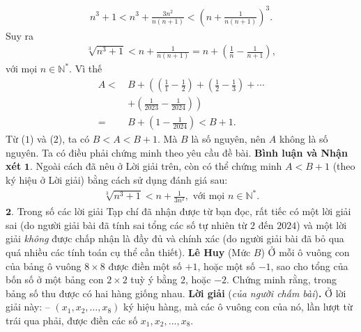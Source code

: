 \begin{multicols}{2}
	\begin{align*}
		{n^3} \!+\! 1 \!<\! {n^3} \!+\! \frac{{3{n^2}}}{{n\left( {n \!+\! 1} \right)}} \!<\! {\left( {n \!+\! \frac{1}{{n\left( {n \!+\! 1} \right)}}} \right)^3}\!.
	\end{align*}
	Suy ra
	\begin{align*}
		\sqrt[3]{{{n^3} \!+\! 1}} \!<\! n \!+\! \frac{1}{{n\left( {n \!+\! 1} \right)}} \!=\! n \!+\! \left( {\frac{1}{n} \!-\! \frac{1}{{n \!+\! 1}}} \right)\!,
	\end{align*}
	với mọi $n \in \mathbb{N^*}$.
	\vskip 0.05cm  
	Vì thế
	\begin{align*}
		A <\,& B + \left( \left( {\frac{1}{1} - \frac{1}{2}} \right) + \left( {\frac{1}{2} - \frac{1}{3}} \right) +  \cdots\right.  \\
			&\left.+ \left( {\frac{1}{{2023}} - \frac{1}{{2024}}} \right) \right) \\
		= \,&B + \left( {1 - \frac{1}{{2024}}} \right) < B + 1. \tag{$2$}
	\end{align*}
	Từ ($1$) và ($2$), ta có $B < A < B + 1$. Mà $B$ là số nguyên, nên $A$ không là số nguyên.
	\vskip 0.05cm
	Ta có điều phải chứng minh theo yêu cầu đề bài.
	\vskip 0.05cm
	\textbf{\color{thachthuctoanhoc}Bình luận và Nhận xét}
	\vskip 0.05cm
	$\pmb{1.}$ Ngoài cách đã nêu ở Lời giải trên, còn có thể chứng minh $A < B + 1$ (theo ký hiệu ở Lời giải) bằng cách sử dụng đánh giá sau:
	\begin{align*}
		\sqrt[3]{{{n^3} + 1}} < n + \frac{1}{{3{n^2}}}, \text{ với mọi } n \in \mathbb{N^*}.
	\end{align*}
	$\pmb{2.}$ Trong số các lời giải Tạp chí đã nhận được từ bạn đọc, rất tiếc có một lời giải sai (do người giải bài đã tính sai tổng các số tự nhiên từ $2$ đến $2024$) và một lời giải \textit{không} được chấp nhận là đầy đủ và chính xác (do người giải bài đã bỏ qua quá nhiều các tính toán cụ thể cần thiết).
	\vskip 0.05cm
		\hfill\textbf{\color{thachthuctoanhoc}Lê Huy}
	\vskip 0.05cm
	{}
	(Mức $B$) Ở mỗi ô vuông con của bảng ô vuông $8\times8$ được điền một số $+1$, hoặc một số $-1$, sao cho tổng của bốn số ở một bảng con $2\times2$ tuỳ ý bằng $2$, hoặc $-2$. Chứng minh rằng, trong bảng số thu được có hai hàng giống nhau.
	\vskip 0.05cm
	\textbf{\color{thachthuctoanhoc}Lời giải} (\textit{của người chấm bài})\textbf{\color{thachthuctoanhoc}.}
	\vskip 0.05cm
	Ở lời giải này:
	\vskip 0.05cm
	-- $\left( {{x_1},{x_2}, \ldots ,{x_8}} \right)$ ký hiệu hàng, mà các ô vuông con của nó, lần lượt từ trái qua phải, được điền các số  ${x_1},{x_2}, \ldots ,{x_8}.$

\end{multicols}
